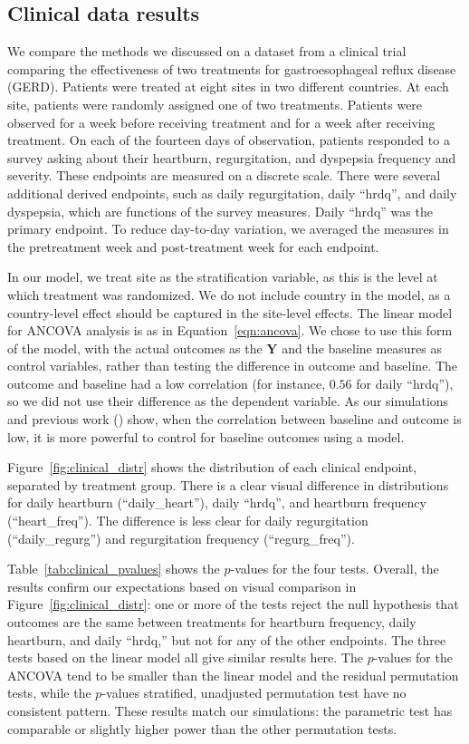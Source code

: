 \documentclass[11pt]{article}
\begin{document}
\subsection{Clinical data results}
We compare the methods we discussed on a dataset from a clinical trial comparing the effectiveness of two treatments for gastroesophageal reflux disease (GERD).
Patients were treated at eight sites in two different countries.
At each site, patients were randomly assigned one of two treatments.
Patients were observed for a week before receiving treatment and for a week after receiving treatment.
On each of the fourteen days of observation, patients responded to a survey asking about their heartburn, regurgitation, and dyspepsia frequency and severity.
These endpoints are measured on a discrete scale.
There were several additional derived endpoints, such as daily regurgitation, daily ``hrdq'', and daily dyspepsia, which are functions of the survey measures.
Daily ``hrdq'' was the primary endpoint.
To reduce day-to-day variation, we averaged the measures in the pretreatment week and post-treatment week for each endpoint.

In our model, we treat site as the stratification variable, as this is the level at which treatment was randomized.
We do not include country in the model, as a country-level effect should be captured in the site-level effects.
The linear model for ANCOVA analysis is as in Equation~\ref{eqn:ancova}.
We chose to use this form of the model, with the actual outcomes as the $\mathbf{Y}$ and the baseline measures as control variables, rather than testing the difference in outcome and baseline. 
The outcome and baseline had a low correlation (for instance, $0.56$ for daily ``hrdq''), so we did not use their difference as the dependent variable. 
As our simulations and previous work (\cite{frison_repeated_1992}) show, when the correlation between baseline and outcome is low, it is more powerful to control for baseline outcomes using a model.

Figure~\ref{fig:clinical_distr} shows the distribution of each clinical endpoint, separated by treatment group.
There is a clear visual difference in distributions for daily heartburn (``daily\_heart''), daily ``hrdq'', and heartburn frequency (``heart\_freq'').
The difference is less clear for daily regurgitation (``daily\_regurg'') and regurgitation frequency (``regurg\_freq'').

Table~\ref{tab:clinical_pvalues} shows the $p$-values for the four tests.
Overall, the results confirm our expectations based on visual comparison in Figure~\ref{fig:clinical_distr}:
one or more of the tests reject the null hypothesis that outcomes are the same between treatments for heartburn frequency, daily heartburn, and daily ``hrdq,''
but not for any of the other endpoints.
The three tests based on the linear model all give similar results here.
The $p$-values for the ANCOVA tend to be smaller than the linear model and the residual permutation tests, while the $p$-values stratified, unadjusted permutation test have no consistent pattern.
These results match our simulations: the parametric test has comparable or slightly higher power than the other permutation tests.
\end{document}
